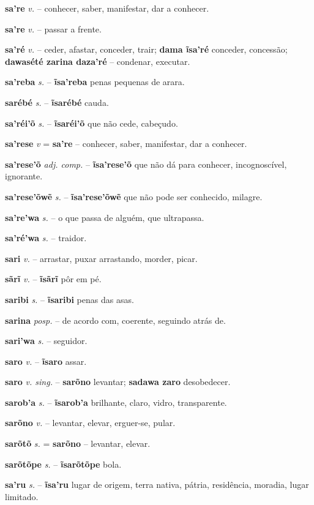 \textbf{sa're} \textit{v.} -- conhecer, saber, manifestar, dar a conhecer.

\textbf{sa're} \textit{v.} -- passar a frente.

\textbf{sa'ré} \textit{v.} -- ceder, afastar, conceder, trair; \textbf{dama ĩsa'ré} conceder, concessão; \textbf{dawasété zarina daza'ré} -- condenar, executar.

\textbf{sa'reba} \textit{s.} -- \textbf{ĩsa'reba} penas pequenas de arara.

\textbf{sarébé} \textit{s.} -- \textbf{ĩsarébé} cauda.

\textbf{sa'réi'õ} \textit{s.} -- \textbf{ĩsaréi'õ} que não cede, cabeçudo.

\textbf{sa'rese} \textit{v} = \textbf{sa're} -- conhecer, saber, manifestar, dar a conhecer.

\textbf{sa'rese'õ} \textit{adj. comp.} -- \textbf{ĩsa'rese'õ} que não dá para conhecer, incognoscível, ignorante.

\textbf{sa'rese'õwẽ} \textit{s.} -- \textbf{ĩsa'rese'õwẽ} que não pode ser conhecido, milagre.

\textbf{sa're'wa} \textit{s.} -- o que passa de alguém, que ultrapassa.

\textbf{sa'ré'wa} \textit{s.} -- traidor.

\textbf{sari} \textit{v.} -- arrastar, puxar arrastando, morder, picar.

\textbf{sãrĩ} \textit{v.} -- \textbf{ĩsãrĩ} pôr em pé.

\textbf{saribi} \textit{s.} -- \textbf{ĩsaribi} penas das asas.

\textbf{sarina} \textit{posp.} -- de acordo com, coerente, seguindo atrás de.

\textbf{sari'wa} \textit{s.} -- seguidor.

\textbf{saro} \textit{v.} -- \textbf{ĩsaro} assar.

\textbf{saro} \textit{v. sing.} -- \textbf{sarõno} levantar; \textbf{sadawa zaro} desobedecer.

\textbf{sarob'a} \textit{s.} -- \textbf{ĩsarob'a} brilhante, claro, vidro, transparente.

\textbf{sarõno} \textit{v.} -- levantar, elevar, erguer-se, pular.

\textbf{sarõtõ} \textit{s.} = \textbf{sarõno} -- levantar, elevar.

\textbf{sarõtõpe} \textit{s.} -- \textbf{ĩsarõtõpe} bola.

\textbf{sa'ru} \textit{s.} -- \textbf{ĩsa'ru} lugar de origem, terra nativa, pátria, residência, moradia, lugar limitado.

